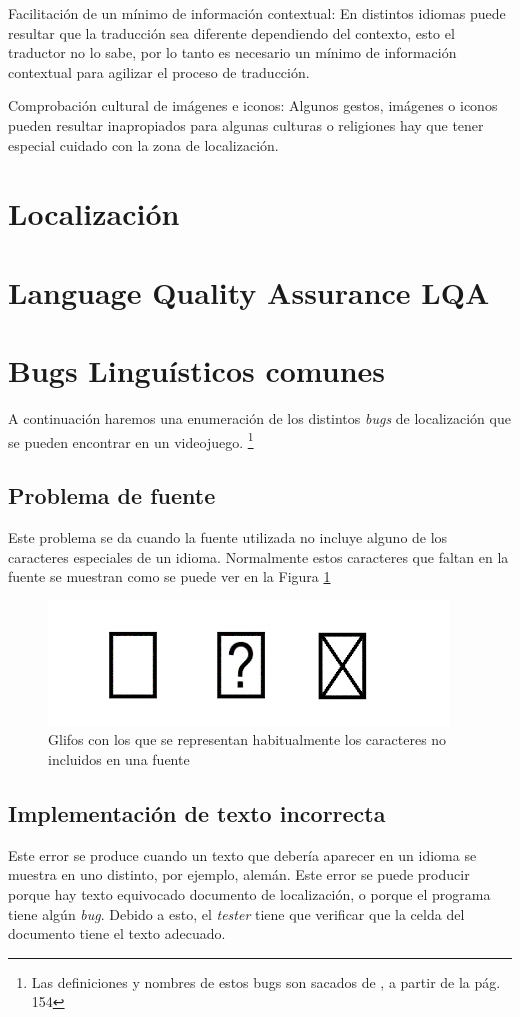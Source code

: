 Facilitación de un mínimo de información contextual: En distintos idiomas puede resultar que la traducción sea diferente dependiendo del contexto, esto el traductor no lo sabe, por lo tanto es necesario un mínimo de información contextual para agilizar el proceso de traducción.

Comprobación cultural de imágenes e iconos: Algunos gestos, imágenes o iconos pueden resultar inapropiados para algunas culturas o religiones hay que tener especial cuidado con la zona de localización.

\section{Localización}
\section{Language Quality Assurance LQA }
\section{Bugs Linguísticos comunes} \label{bugs}
A continuación haremos una enumeración de los distintos \textit{bugs} de localización que se pueden encontrar en un videojuego. \footnote{Las definiciones y nombres de estos bugs son sacados de \citet{LQAPSM2017}, a partir de la pág. 154}
\subsection{Problema de fuente} \label{ErrorFuente}
Este problema se da cuando la fuente utilizada no incluye alguno de los caracteres especiales de un idioma. Normalmente estos caracteres que faltan en la fuente se muestran como se puede ver en la Figura \ref{Notdef}

\begin{figure}[H]

	\centering
	\includegraphics{Imagenes/BugsLQA/Notdef.png}
	\caption{Glifos con los que se representan habitualmente los caracteres no incluidos en una fuente}
	\label{Notdef}
\end{figure}
	
\subsection{Implementación de texto incorrecta}\label{ErrorImpIncorrecta}
Este error se produce cuando un texto que debería aparecer en un idioma se muestra en uno distinto, por ejemplo, alemán. Este error se puede producir porque hay texto equivocado documento de localización, o porque el programa tiene algún \textit{bug}. Debido a esto, el \textit{tester} tiene que verificar que la celda del documento tiene el texto adecuado.  
